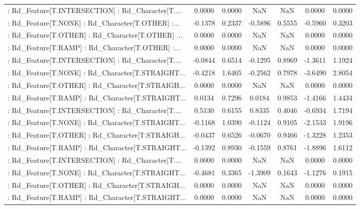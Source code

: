 \begin{longtable}{p{4cm}cccccc}
 : Rd\_Feature[T.INTERSECTION] : Rd\_Character[T.... &  0.0000 &    0.0000 &     NaN &          NaN &  0.0000 &  0.0000 \\
 : Rd\_Feature[T.NONE] : Rd\_Character[T.OTHER] :... & -0.1378 &    0.2337 & -0.5896 &       0.5555 & -0.5960 &  0.3203 \\
 : Rd\_Feature[T.OTHER] : Rd\_Character[T.OTHER] ... &  0.0000 &    0.0000 &     NaN &          NaN &  0.0000 &  0.0000 \\
 : Rd\_Feature[T.RAMP] : Rd\_Character[T.OTHER] :... &  0.0000 &    0.0000 &     NaN &          NaN &  0.0000 &  0.0000 \\
 : Rd\_Feature[T.INTERSECTION] : Rd\_Character[T.... & -0.0844 &    0.6514 & -0.1295 &       0.8969 & -1.3611 &  1.1924 \\
 : Rd\_Feature[T.NONE] : Rd\_Character[T.STRAIGHT... & -0.4218 &    1.6465 & -0.2562 &       0.7978 & -3.6490 &  2.8054 \\
 : Rd\_Feature[T.OTHER] : Rd\_Character[T.STRAIGH... &  0.0000 &    0.0000 &     NaN &          NaN &  0.0000 &  0.0000 \\
 : Rd\_Feature[T.RAMP] : Rd\_Character[T.STRAIGHT... &  0.0134 &    0.7296 &  0.0184 &       0.9853 & -1.4166 &  1.4434 \\
 : Rd\_Feature[T.INTERSECTION] : Rd\_Character[T.... &  0.5130 &    0.6155 &  0.8335 &       0.4046 & -0.6934 &  1.7194 \\
 : Rd\_Feature[T.NONE] : Rd\_Character[T.STRAIGHT... & -0.1168 &    1.0390 & -0.1124 &       0.9105 & -2.1533 &  1.9196 \\
 : Rd\_Feature[T.OTHER] : Rd\_Character[T.STRAIGH... & -0.0437 &    0.6526 & -0.0670 &       0.9466 & -1.3228 &  1.2353 \\
 : Rd\_Feature[T.RAMP] : Rd\_Character[T.STRAIGHT... & -0.1392 &    0.8930 & -0.1559 &       0.8761 & -1.8896 &  1.6112 \\
 : Rd\_Feature[T.INTERSECTION] : Rd\_Character[T.... &  0.0000 &    0.0000 &     NaN &          NaN &  0.0000 &  0.0000 \\
 : Rd\_Feature[T.NONE] : Rd\_Character[T.STRAIGHT... & -0.4681 &    0.3365 & -1.3909 &       0.1643 & -1.1276 &  0.1915 \\
 : Rd\_Feature[T.OTHER] : Rd\_Character[T.STRAIGH... &  0.0000 &    0.0000 &     NaN &          NaN &  0.0000 &  0.0000 \\
 : Rd\_Feature[T.RAMP] : Rd\_Character[T.STRAIGHT... &  0.0000 &    0.0000 &     NaN &          NaN &  0.0000 &  0.0000 \\

\end{longtable}
